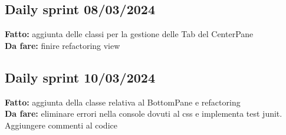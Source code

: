 \documentclass{report}
\begin{document}
\begin{itemize}
\subsection*{Daily sprint 08/03/2024}
\textbf{Fatto:} aggiunta delle classi per la gestione delle Tab del CenterPane\\
\textbf{Da fare:} finire refactoring view
\subsection*{Daily sprint 10/03/2024}
\textbf{Fatto:} aggiunta della classe relativa al BottomPane e refactoring\\
\textbf{Da fare:} eliminare errori nella console dovuti al css e implementa test junit.\\
Aggiungere commenti al codice




\end{itemize}
\end{document}
